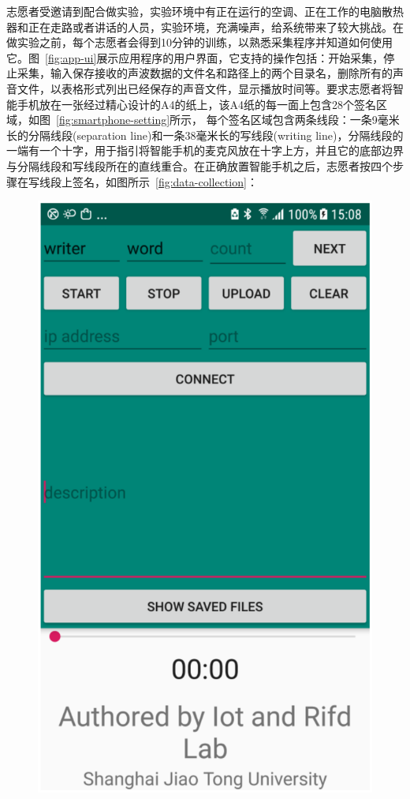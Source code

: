 志愿者受邀请到配合做实验，实验环境中有正在运行的空调、正在工作的电脑散热器和正在走路或者讲话的人员，实验环境，充满噪声，给系统带来了较大挑战。在做实验之前，每个志愿者会得到10分钟的训练，以熟悉采集程序并知道如何使用它。图~\ref{fig:app-ui}展示应用程序的用户界面，它支持的操作包括：开始采集，停止采集，输入保存接收的声波数据的文件名和路径上的两个目录名，删除所有的声音文件，以表格形式列出已经保存的声音文件，显示播放时间等。要求志愿者将智能手机放在一张经过精心设计的A4的纸上，该A4纸的每一面上包含28个签名区域，如图~\ref{fig:smartphone-setting}所示，
每个签名区域包含两条线段：一条9毫米长的分隔线段(separation line)和一条38毫米长的写线段(writing line)，分隔线段的一端有一个十字，用于指引将智能手机的麦克风放在十字上方，并且它的底部边界与分隔线段和写线段所在的直线重合。在正确放置智能手机之后，志愿者按四个步骤在写线段上签名，如图所示~\ref{fig:data-collection}：
\begin{figure}[!htp]
  \centering
  \begin{minipage}[t]{0.32\textwidth}
    \centering
    \includegraphics[width=\textwidth]{figure/app-ui.pdf}

\end{minipage}
\end{figure}
